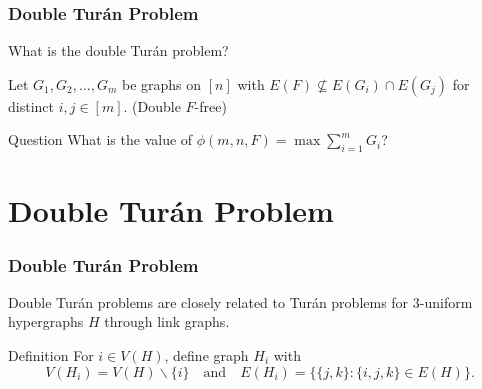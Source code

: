 \documentclass{beamer}
\begin{document}
\begin{frame}
\frametitle{Double Turán Problem}

What is the double Turán problem? \pause

\vspace{0.5cm}

Let $G_1, G_2, \ldots, G_m$ be graphs on $[n]$ with $E(F) \not\subseteq E(G_i) \cap E(G_j)$ for distinct $i, j \in [m]$. \pause (\alert{Double $F$-free})

\pause

\begin{block}{Question}
  What is the value of $\phi(m, n, F) = \max \sum_{i = 1}^m G_i$?
\end{block}
\end{frame}

\section{Double Turán Problem}

\begin{frame}
  \frametitle{Double Turán Problem}

  Double Turán problems are closely related to Turán problems for $3$-uniform hypergraphs $H$ through \alert{link graphs}.

  \pause

  \vspace{0.3cm}

  \begin{block}{Definition}
    For $i \in V(H)$, define graph $H_i$ with
    \[
      V(H_i) = V(H) \backslash \{i\} \quad \text{and} \quad E(H_i) = \{\{j, k\} : \{i, j, k\} \in E(H)\}.
    \]
  \end{block}
\end{frame}
\end{document}
